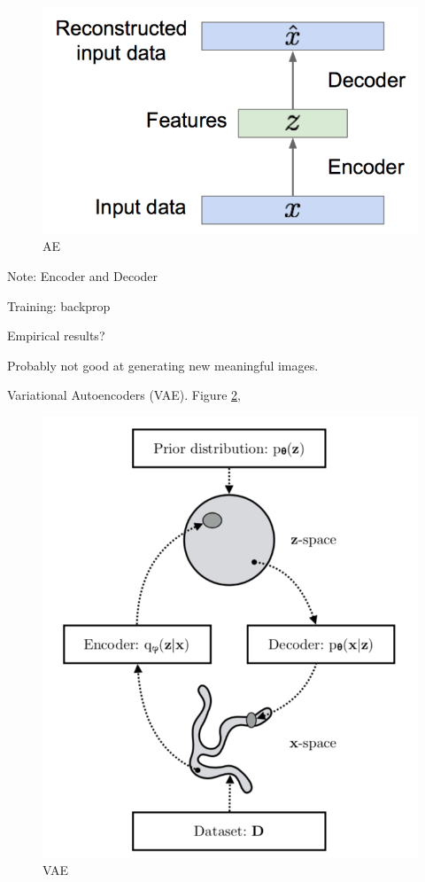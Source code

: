 \documentclass[english]{article}
\begin{document}
\begin{figure}
  \centering
  \includegraphics[scale=0.5]{ae0.png}
    \caption{AE}
    \label{ae0}
\end{figure}

Note: Encoder and Decoder

Training: backprop

Empirical results?

Probably not good at generating new meaningful images.

\item Variational Autoencoders  (VAE). Figure \ref{vae},

\begin{figure}
  \centering
  \includegraphics[scale=0.6]{vae.png}
    \caption{VAE}
    \label{vae}
\end{figure}
\end{document}
